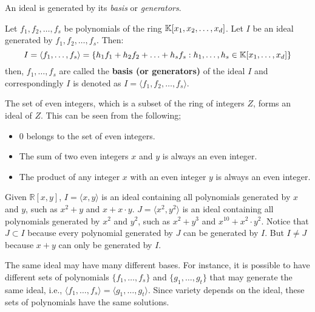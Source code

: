 An ideal is generated by its {\it basis} or {\it generators}.

\begin{Definition}
Let $f_1, f_2, \ldots, f_s$ be 
polynomials of the ring ${\mathbb{K}}[x_1, x_2, \ldots, x_d]$. 
Let $I$ be an ideal generated by $f_1, f_2, \ldots, f_s$. Then:
\begin{equation}
I = \langle f_1,\dots,f_s \rangle=\{h_1 f_1 + h_2 f_2 + \ldots + h_s f_s : h_1,\dots,h_s\in{\mathbb{K}}[x_1, \dots, x_d]\} \nonumber
\end{equation}
then, $f_1, \ldots, f_s$ are called the {\bf basis (or generators)} of the 
ideal $I$ and correspondingly $I$ is denoted as $I = \langle f_1, f_2, 
\ldots, f_s \rangle$. 
\end{Definition}

\begin{Example}
The set of even integers, which is a subset of the ring of integers
$Z$, forms an ideal of $Z$. This can be seen from the following;
\begin{itemize}
\item $0$ belongs to the set of even integers.
\item The sum of two even integers $x$ and $y$ is always an even
  integer.
\item The product of any integer $x$ with an even integer $y$ is
  always an even integer.
\end{itemize}
\end{Example}

\begin{Example}
Given $\mathbb{R}\left[x,y\right]$, $I = \langle x, y \rangle$ is an 
ideal containing all polynomials generated by $x$ and $y$, 
such as $x^2+y$ and $x+x\cdot y$.
$J = \langle x^2, y^2 \rangle$ is an ideal containing all polynomials 
generated by $x^2$ and $y^2$, such as $x^2+y^3$ and $x^{10}+x^2\cdot y^2$. 
Notice that $J\subset I$ because every polynomial generated by $J$ can
be generated by $I$. 
But $I\neq J$ because $x+y$ can only be generated by $I$.
\end{Example}

The same ideal may have many different bases.
For instance, it is possible to have different sets of polynomials
$\{f_1,\dots,f_{s}\}$ and $\{g_{1},\dots,g_{t}\}$ that may generate the same 
ideal, i.e., 
$\langle f_{1},\dots,f_{s}\rangle=\langle g_{1},\dots,g_{t}\rangle$. Since 
variety depends on the ideal, these sets of polynomials have the same 
solutions.

